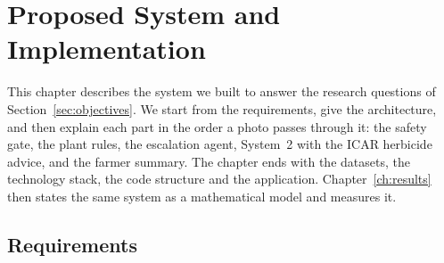 \chapter{Proposed System and Implementation}\label{ch:proposed}

This chapter describes the system we built to answer the research questions of
Section~\ref{sec:objectives}. We start from the requirements, give the architecture, and then explain each
part in the order a photo passes through it: the safety gate, the plant rules, the escalation agent,
System~2 with the ICAR herbicide advice, and the farmer summary. The chapter ends with the datasets, the
technology stack, the code structure and the application. Chapter~\ref{ch:results} then states the same
system as a mathematical model and measures it.

\section{Requirements}
